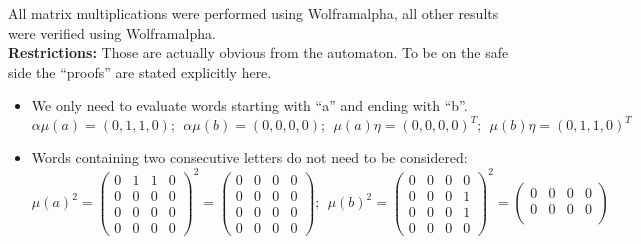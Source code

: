                
            All matrix multiplications were performed using Wolframalpha, all other results were verified using Wolframalpha. \\
            
            \textbf{Restrictions:} Those are actually obvious from the automaton. To be on the safe side the ``proofs'' are stated explicitly here.
            \begin{itemize}
                \item We only need to evaluate words starting with ``a'' and ending with ``b''.
                    \[ \alpha \mu(a) = (0,1,1,0); \ \ \alpha \mu(b) = (0,0,0,0); \ \ \mu(a) \eta = (0,0,0,0)^T; \ \ \mu(b) \eta = (0, 1, 1, 0)^T \]
                \item Words containing two consecutive letters do not need to be considered:
                    \[  \mu(a)^2 = \begin{pmatrix}
                                        0 & 1 & 1 & 0 \\
                                        0 & 0 & 0 & 0 \\
                                        0 & 0 & 0 & 0 \\
                                        0 & 0 & 0 & 0
                                    \end{pmatrix}^2 = \begin{pmatrix}
                                        0 & 0 & 0 & 0 \\
                                        0 & 0 & 0 & 0 \\
                                        0 & 0 & 0 & 0 \\
                                        0 & 0 & 0 & 0
                                    \end{pmatrix};  \ \ \mu(b)^2 = \begin{pmatrix}
                                        0 & 0 & 0 & 0 \\
                                        0 & 0 & 0 & 1 \\
                                        0 & 0 & 0 & 1 \\
                                        0 & 0 & 0 & 0
                                    \end{pmatrix}^2 = \begin{pmatrix}
                                        0 & 0 & 0 & 0 \\
                                        0 & 0 & 0 & 0 \\

\end{pmatrix}\]
\end{itemize}
